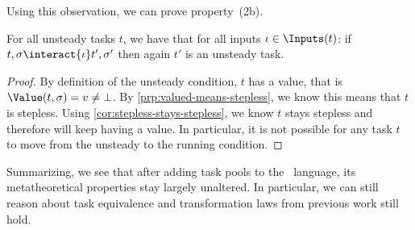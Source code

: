 Using this observation, we can prove property~(2b).
\begin{proposition}
  For all unsteady tasks $t$,
  we have that for all inputs $\iota \in \Inputs(t)$:
    if $t,\sigma \interact{\iota} t',\sigma'$
    then again $t'$ is an unsteady task.
\end{proposition}
\begin{proof}
  By definition of the unsteady condition, $t$ has a value,
  that is $\Value(t,\sigma) = v \neq \bot$.
  By \cref{prp:valued-means-stepless}, we know this means that $t$ is stepless.
  Using \cref{cor:stepless-stays-stepless}, we know $t$ stays stepless
  and therefore will keep having a value.
  In particular, it is not possible for any task $t$ to move from the unsteady to the running condition.
\end{proof}

Summarizing, we see that after adding task pools to the \TOPHAT\ language,
its metatheoretical properties stay largely unaltered.
In particular, we can still reason about task equivalence
and transformation laws from previous work still hold.